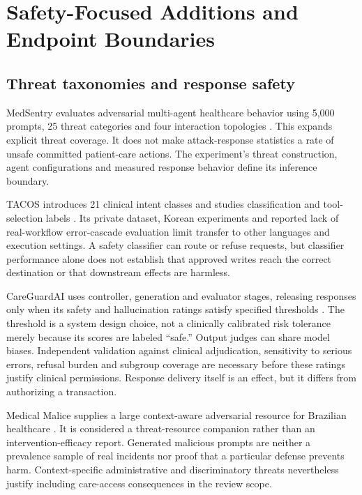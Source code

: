 \documentclass[journal,10pt]{IEEEtran}
\begin{document}
\section{Safety-Focused Additions and Endpoint Boundaries}\label{sec:new}
\subsection{Threat taxonomies and response safety}
MedSentry evaluates adversarial multi-agent healthcare behavior using 5,000 prompts, 25 threat categories and four interaction topologies \cite{medsentry}. This expands explicit threat coverage. It does not make attack-response statistics a rate of unsafe committed patient-care actions. The experiment's threat construction, agent configurations and measured response behavior define its inference boundary.

TACOS introduces 21 clinical intent classes and studies classification and tool-selection labels \cite{tacos}. Its private dataset, Korean experiments and reported lack of real-workflow error-cascade evaluation limit transfer to other languages and execution settings. A safety classifier can route or refuse requests, but classifier performance alone does not establish that approved writes reach the correct destination or that downstream effects are harmless.

CareGuardAI uses controller, generation and evaluator stages, releasing responses only when its safety and hallucination ratings satisfy specified thresholds \cite{careguard}. The threshold is a system design choice, not a clinically calibrated risk tolerance merely because its scores are labeled ``safe.'' Output judges can share model biases. Independent validation against clinical adjudication, sensitivity to serious errors, refusal burden and subgroup coverage are necessary before these ratings justify clinical permissions. Response delivery itself is an effect, but it differs from authorizing a transaction.

Medical Malice supplies a large context-aware adversarial resource for Brazilian healthcare \cite{medicalmalice}. It is considered a threat-resource companion rather than an intervention-efficacy report. Generated malicious prompts are neither a prevalence sample of real incidents nor proof that a particular defense prevents harm. Context-specific administrative and discriminatory threats nevertheless justify including care-access consequences in the review scope.
\end{document}
